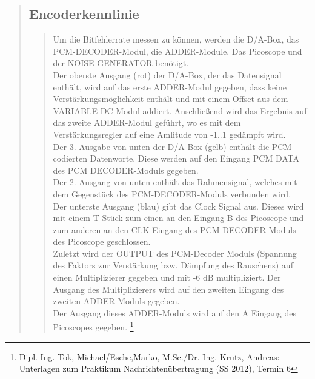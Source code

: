 \begin{quote}
    
    
    \subsection{Encoderkennlinie}
    \begin{quote}
        
        Um die Bitfehlerrate messen zu können, werden die D/A-Box, das PCM-DECODER-Modul, die ADDER-Module, Das Picoscope
       und der NOISE GENERATOR benötigt.\\
       Der oberste Ausgang (rot) der D/A-Box, der das Datensignal enthält, wird auf das erste ADDER-Modul gegeben, dass
       keine Verstärkungsmöglichkeit enthält und mit einem Offset aus dem VARIABLE DC-Modul addiert. Anschließend wird
       das Ergebnis auf das zweite ADDER-Modul geführt, wo es mit dem Verstärkungsregler auf eine Amlitude von -1..1
       gedämpft wird.\\
       Der 3. Ausgabe von unten der D/A-Box (gelb) enthält die PCM codierten Datenworte. Diese werden auf den Eingang
       PCM DATA des PCM DECODER-Moduls gegeben.\\
       Der 2. Ausgang von unten enthält das Rahmensignal, welches mit dem Gegenstück des PCM-DECODER-Moduls verbunden
       wird.\\
       Der unterste Ausgang (blau) gibt das Clock Signal aus. Dieses wird mit einem T-Stück zum einen an den Eingang B
       des Picoscope und zum anderen an den CLK Eingang des PCM DECODER-Moduls des Picoscope geschlossen.\\
       Zuletzt wird der OUTPUT des PCM-Decoder Moduls (Spannung des Faktors zur Verstärkung bzw. Dämpfung des Rauschens)
       auf einen Multiplizierer gegeben und mit -6 dB multipliziert. Der Ausgang des Multiplizierers wird auf den
       zweiten Eingang des zweiten ADDER-Moduls gegeben.\\
       Der Ausgang dieses ADDER-Moduls wird auf den A Eingang des Picoscopes gegeben.
        \footnote[5]{Dipl.-Ing. Tok, Michael/Esche,Marko, M.Sc./Dr.-Ing. Krutz, Andreas: Unterlagen zum Praktikum
        Nachrichtenübertragung (SS 2012), Termin 6}
       
       

    \end{quote}
    
   
\end{quote}

